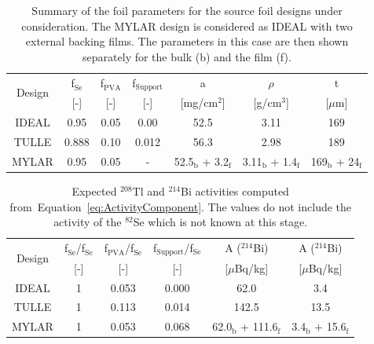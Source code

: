 \documentclass[main.tex]{subfiles}
\begin{document}
\begin{table}[h!]
\centering
\begin{tabular}{c|c|c|c|c|c|c}
\multirow{2}{*}{Design} & f$_\text{Se}$ & f$_\text{PVA}$ & f$_\text{Support}$ & a                  & $\rho$            & t \\
                        & [-]           & [-]            & [-]                & [mg/cm$^\text{2}$] & [g/cm$^\text{3}$] & [$\mu$m] \\[0.1cm]
\toprule
IDEAL & 0.95  & 0.05 & 0.00  & 52.5                             & 3.11 & 169 \\[0.1cm]
TULLE & 0.888 & 0.10 & 0.012 & 56.3                             & 2.98 & 189 \\[0.1cm]
MYLAR & 0.95  & 0.05 & -     & 52.5$_\text{b}$ + 3.2$_\text{f}$ & 3.11$_\text{b}$ + 1.4$_\text{f}$ & 169$_\text{b}$ + 24$_\text{f}$ \\[0.1cm]
\bottomrule
\end{tabular}
\caption{Summary of the foil parameters for the source foil designs under consideration. The MYLAR design is considered as IDEAL with two external backing films. The parameters in this case are then shown separately for the bulk (b) and the film (f).}
\label{Tab:SummaryParametersSourceFoilDesign}
\end{table}



\begin{table}[h!]
\centering
\begin{tabular}{c|c|c|c|c|c}
\multirow{2}{*}{Design} & f$_\text{Se}$/f$_\text{Se}$ & f$_\text{PVA}$/f$_\text{Se}$ & f$_\text{Support}$/f$_\text{Se}$ & A ($^{\text{214}}$Bi) & A ($^{\text{214}}$Bi)  \\
& [-]   & [-]   & [-]   & [$\mu$Bq/kg] & [$\mu$Bq/kg] \\[0.1cm]
\toprule
IDEAL & 1 & 0.053 & 0.000 & 62.0                               & 3.4   \\[0.1cm]
TULLE & 1 & 0.113 & 0.014 & 142.5                              & 13.5  \\[0.1cm]
MYLAR & 1 & 0.053 & 0.068 & 62.0$_\text{b}$ + 111.6$_\text{f}$ & 3.4$_\text{b}$ + 15.6$_\text{f}$  \\[0.1cm]
\bottomrule
\end{tabular}
\caption{Expected $^{\text{208}}$Tl and $^{\text{214}}$Bi activities computed from~Equation~\ref{eq:ActivityComponent}. The values do not include the activity of the $^{\text{82}}$Se which is not known at this stage.}
\label{Tab:ExpectedBkgSourceFoilDesign}
\end{table}
\end{document}
